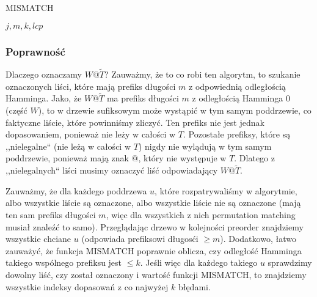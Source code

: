 \documentclass[a4paper,11pt]{article}
\newcommand{\algorithmicinput}{\textbf{input}}
\newcommand{\INPUT}{\item[\algorithmicinput]}
\begin{document}
\begin{algorithm}[H]
\caption{MISMATCH}
\begin{algorithmic}
\INPUT{$j,m,k,lcp$}
    \ENDIF
\ENDWHILE
{}
\end{algorithmic}
\end{algorithm}
\par
\subsubsection*{Poprawność}
Dlaczego oznaczamy $W@\tilde{T}$? Zauważmy, że to co robi ten algorytm, to szukanie oznaczonych liści, które mają prefiks długości $m$ z odpowiednią odległością Hamminga. Jako, że  $W@\tilde{T}$ ma prefiks długości $m$ z odległością Hamminga $0$ (część $W$), to w drzewie sufiksowym może wystąpić w tym samym poddrzewie, co faktyczne liście, które powinniśmy zliczyć. Ten prefiks nie jest jednak dopasowaniem, ponieważ nie leży w całości w $T$. Pozostałe prefiksy, które są ,,nielegalne“ (nie leżą w całości w $T$) nigdy nie wylądują w tym samym poddrzewie, ponieważ mają znak $@$, który nie występuje w $T$. Dlatego z ,,nielegalnych“ liści musimy oznaczyć liść odpowiadający $W@\tilde{T}$.
\par
Zauważmy, że dla każdego poddrzewa $u$, które rozpatrywaliśmy w algorytmie, albo wszystkie liście są oznaczone, albo wszystkie liście nie są oznaczone (mają ten sam prefiks długości $m$, więc dla wszystkich z nich permutation matching musiał znaleźć to samo). Przeglądając drzewo w kolejności preorder znajdziemy wszystkie chciane $u$ (odpowiada prefiksowi długosći $\geq m$). Dodatkowo, łatwo zauważyć, że funkcja MISMATCH poprawnie oblicza, czy odległość Hamminga takiego wspólnego prefiksu jest $\leq k$. Jeśli więc dla każdego takiego $u$ sprawdzimy dowolny liść, czy został oznaczony i wartość funkcji MISMATCH, to znajdziemy wszystkie indeksy dopasowań z co najwyżej $k$ błędami.
\end{document}
